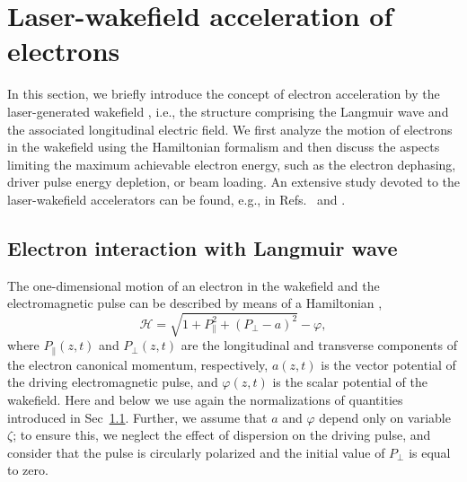 \documentclass[10pt, a4paper, twoside, openright]{report}
\begin{document}

\section{Laser-wakefield acceleration of electrons\label{sec:lwfa}}
%

In this section, we briefly introduce the concept of electron acceleration by the laser-generated wakefield \cite{Tajima1979}, i.e., the structure comprising the Langmuir wave and the associated longitudinal electric field. We first analyze the motion of electrons in the wakefield using the Hamiltonian formalism and then discuss the aspects limiting the maximum achievable electron energy, such as the electron dephasing, driver pulse energy depletion, or beam loading. An extensive study devoted to the laser-wakefield accelerators can be found, e.g., in Refs.~ and .



\subsection{Electron interaction with Langmuir wave}
%

The one-dimensional motion of an electron in the wakefield and the electromagnetic pulse can be described by means of a Hamiltonian \cite{Esirkepov2006, Esarey2009, Bulanov2013, Bulanov2016},
\begin{equation}\label{eq:hamiltonian}
\mathcal{H} = \sqrt{1 + P_{\parallel}^2 + \left( P_{\bot} - a \right)^2} - \varphi,
\end{equation}
where $ P_{\parallel} \left( z, t \right) $ and $ P_{\bot} \left( z, t \right) $ are the longitudinal and transverse components of the electron canonical momentum, respectively, $ a \left( z, t \right) $ is the vector potential of the driving electromagnetic pulse, and $ \varphi \left( z, t \right) $ is the scalar potential of the wakefield. Here and below we use again the normalizations of quantities introduced in Sec~\ref{}. Further, we assume that $ a $ and $ \varphi $ depend only on variable $ \zeta $; to ensure this, we neglect the effect of dispersion on the driving pulse, and consider that the pulse is circularly polarized and the initial value of $ P_{\bot} $ is equal to zero.
\end{document}
